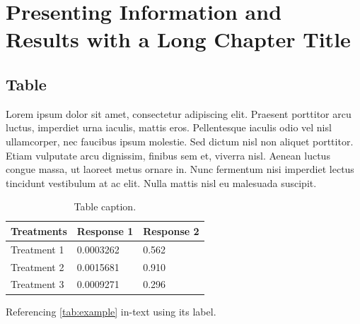 \documentclass[
	11pt,
	fleqn,
	a4paper,
]{LegrandOrangeBook}
\begin{document}
\chapter{Presenting Information and Results with a Long Chapter Title}

\section{Table}

Lorem ipsum dolor sit amet, consectetur adipiscing elit. Praesent porttitor arcu luctus, imperdiet urna iaculis, mattis eros. Pellentesque iaculis odio vel nisl ullamcorper, nec faucibus ipsum molestie. Sed dictum nisl non aliquet porttitor. Etiam vulputate arcu dignissim, finibus sem et, viverra nisl. Aenean luctus congue massa, ut laoreet metus ornare in. Nunc fermentum nisi imperdiet lectus tincidunt vestibulum at ac elit. Nulla mattis nisl eu malesuada suscipit.

\begin{table}[H] %
	\centering %
	\begin{tabular}{L{0.15\textwidth} R{0.15\textwidth} R{0.15\textwidth}} %
		\toprule
		\textbf{Treatments} & \textbf{Response 1} & \textbf{Response 2} \\
		\midrule
		Treatment 1         & 0.0003262           & 0.562               \\
		Treatment 2         & 0.0015681           & 0.910               \\
		Treatment 3         & 0.0009271           & 0.296               \\
		\bottomrule
	\end{tabular}
	\caption{Table caption.}
	\label{tab:example} %
\end{table}

Referencing \autoref{tab:example} in-text using its label.
\end{document}
